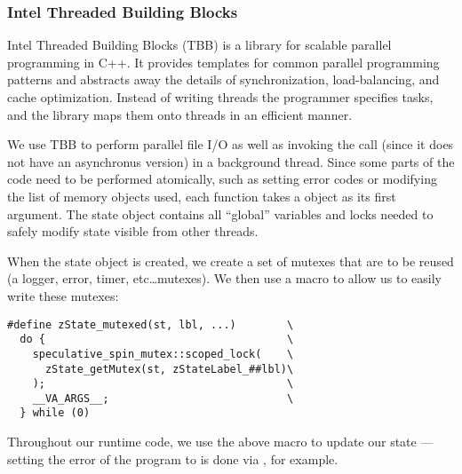 
\subsubsection{Intel Threaded Building Blocks}
Intel Threaded Building Blocks\cite{reinders2007intel} (TBB) is a library for
scalable parallel
programming in C++. It provides templates for common parallel programming
patterns and abstracts away the details of synchronization, load-balancing,
and cache optimization. Instead of writing threads the programmer specifies
tasks, and the library maps them onto threads in an efficient manner.

We use TBB to perform parallel file I/O as well as invoking the
	 call (since it does not have an asynchronus version)
	in a background thread.
Since some parts of the code need to be performed atomically, such as
	setting error codes or modifying the list of memory objects used,
	each function takes a  object as its first argument.
The state object contains all ``global'' variables and locks needed to
	safely modify state visible from other threads.


When the state object is created, we create a set of mutexes that
	are to be reused (a logger, error, timer, etc\ldots mutexes).
We then use a macro to allow us to easily write these mutexes:

\begin{verbatim}
#define zState_mutexed(st, lbl, ...)        \
  do {                                      \
    speculative_spin_mutex::scoped_lock(    \
      zState_getMutex(st, zStateLabel_##lbl)\
    );                                      \
    __VA_ARGS__;                            \
  } while (0)
\end{verbatim}


Throughout our runtime code, we use the above macro to update our state ---
 	setting the error of the program to  is done via ,
	for example.



